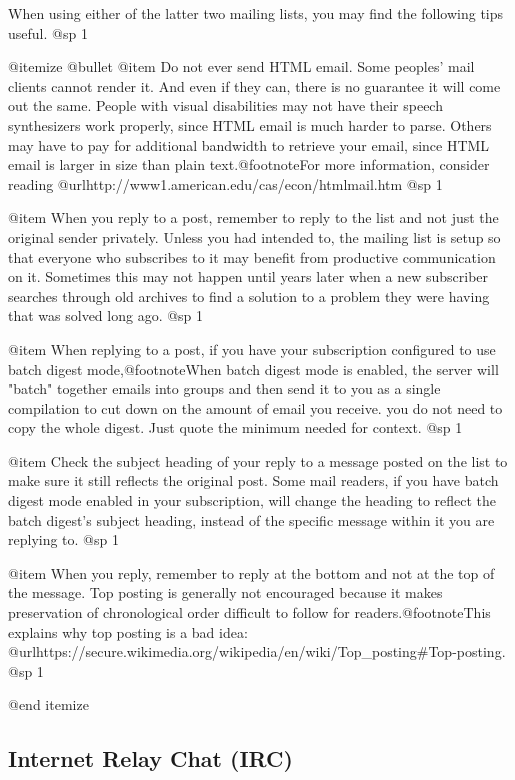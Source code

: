 When using either of the latter two mailing lists, you may find the following tips useful.
@sp 1

@itemize @bullet
@item
Do not ever send HTML email. Some peoples' mail clients cannot render it. And even if they can, there is no guarantee it will come out the same. People with visual disabilities may not have their speech synthesizers work properly, since HTML email is much harder to parse. Others may have to pay for additional bandwidth to retrieve your email, since HTML email is larger in size than plain text.@footnote{For more information, consider reading @url{http://www1.american.edu/cas/econ/htmlmail.htm}}
@sp 1

@item
When you reply to a post, remember to reply to the list and not just the original sender privately. Unless you had intended to, the mailing list is setup so that everyone who subscribes to it may benefit from productive communication on it. Sometimes this may not happen until years later when a new subscriber searches through old archives to find a solution to a problem they were having that was solved long ago.
@sp 1

@item
When replying to a post, if you have your subscription configured to use batch digest mode,@footnote{When batch digest mode is enabled, the server will "batch" together emails into groups and then send it to you as a single compilation to cut down on the amount of email you receive.} you do not need to copy the whole digest. Just quote the minimum needed for context.
@sp 1

@item
Check the subject heading of your reply to a message posted on the list to make sure it still reflects the original post. Some mail readers, if you have batch digest mode enabled in your subscription, will change the heading to reflect the batch digest's subject heading, instead of the specific message within it you are replying to.
@sp 1

@item
When you reply, remember to reply at the bottom and not at the top of the message. Top posting is generally not encouraged because it makes preservation of chronological order difficult to follow for readers.@footnote{This explains why top posting is a bad idea: @url{https://secure.wikimedia.org/wikipedia/en/wiki/Top_posting#Top-posting}.}
@sp 1

@end itemize

\subsection{Internet Relay Chat (IRC)}

